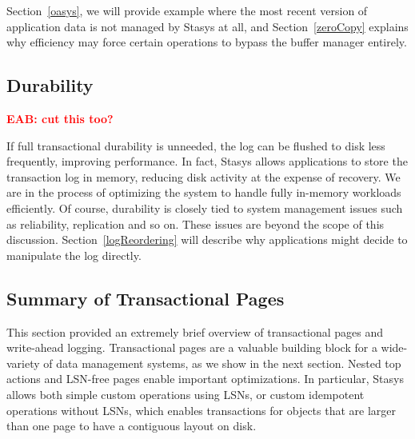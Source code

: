 \documentclass[letterpaper,twocolumn,10pt]{article}
\newcommand{\yad}{Stasys\xspace}
\newcommand{\eab}[1]{\textcolor{red}{\bf EAB: #1}}
\newcommand{\eat}[1]{}
\begin{document}
Section~\ref{oasys}, we will provide example where the most recent
version of application data is not managed by \yad at all, and
Section~\ref{zeroCopy} explains why efficiency may force certain
operations to bypass the buffer manager entirely.


\subsection{Durability}

\eab{cut this too?}

\eat{\yad makes use of the same basic recovery strategy as existing
write-ahead-logging schemes such as ARIES.  Recovery consists of three
stages, {\em analysis}, {\em redo}, and {\em undo}.  Analysis is
essentially a performance optimization, and makes use of information
left during forward operation to reduce the cost of redo and undo.  It
also decides which transactions committed, and which aborted.  The
redo phase iterates over the log, applying the redo function of each
logged operation if necessary.  Once the log has been played forward,
the page file and buffer manager are in the same conceptual state they
were in at crash.  The undo phase simply aborts each transaction that
does not have a commit entry, exactly as it would during normal
operation.
}
If full transactional durability is
unneeded, the log can be flushed to disk less frequently, improving
performance.  In fact, \yad allows applications to store the
transaction log in memory, reducing disk activity at the expense of
recovery.  We are in the process of optimizing the system to handle
fully in-memory workloads efficiently.  Of course, durability is closely
tied to system management issues such as reliability, replication and so on.  
These issues are beyond the scope of this discussion.  Section~\ref{logReordering} will describe why applications might decide to manipulate the log directly.

\subsection{Summary of Transactional Pages}

This section provided an extremely brief overview of transactional
pages and write-ahead logging.  Transactional pages are a valuable
building block for a wide-variety of data management systems, as we
show in the next section.  Nested top actions and LSN-free pages
enable important optimizations.  In particular, \yad allows both
simple custom operations using LSNs, or custom idempotent operations
without LSNs, which enables transactions for objects that are larger than
one page to have a contiguous layout on disk.
\end{document}
